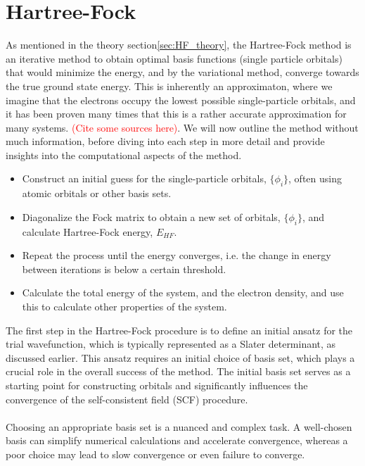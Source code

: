 \documentclass{subfiles}
\begin{document}
\section{Hartree-Fock}
As mentioned in the theory section\ref{sec:HF_theory}, the Hartree-Fock method is an iterative method to obtain optimal basis functions (single particle orbitals) that would minimize the energy, and by the variational method, converge towards the true ground state energy. This is inherently an approximaton, where we imagine that the electrons occupy the lowest possible single-particle orbitals, and it has been proven many times that this is a rather accurate approximation for many systems. \textcolor{red}{(Cite some sources here)}.
We will now outline the method without much information, before diving into each step in more detail and provide insights into the computational aspects of the method.
\begin{itemize}
    \item Construct an initial guess for the single-particle orbitals, $\{\phi_i\}$, often using atomic orbitals or other basis sets.
    \item Diagonalize the Fock matrix to obtain a new set of orbitals, $\{\phi_i\}$, and calculate Hartree-Fock energy, $E_{HF}$.
    \item Repeat the process until the energy converges, i.e. the change in energy between iterations is below a certain threshold.
    \item Calculate the total energy of the system, and the electron density, and use this to calculate other properties of the system.
\end{itemize}
The first step in the Hartree-Fock procedure is to define an initial ansatz for the trial wavefunction, which is typically represented as a Slater determinant, as discussed earlier. This ansatz requires an initial choice of basis set, which plays a crucial role in the overall success of the method. The initial basis set serves as a starting point for constructing orbitals and significantly influences the convergence of the self-consistent field (SCF) procedure.\\  
\\ Choosing an appropriate basis set is a nuanced and complex task. A well-chosen basis can simplify numerical calculations and accelerate convergence, whereas a poor choice may lead to slow convergence or even failure to converge. 
\\ \\
\end{document}
